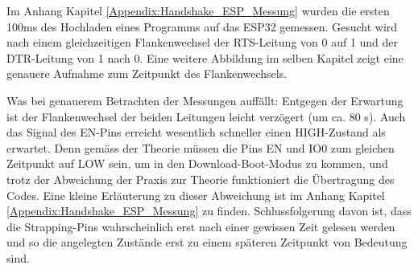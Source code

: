 \begin{enumerate}
\begin{enumerate}
Im Anhang Kapitel \ref{Appendix:Handshake_ESP_Messung} wurden die ersten 100ms des Hochladen eines Programms auf das ESP32 gemessen. Gesucht wird nach einem gleichzeitigen Flankenwechsel der RTS-Leitung von 0 auf 1 und der DTR-Leitung von 1 nach 0. Eine weitere Abbildung im selben Kapitel zeigt eine genauere Aufnahme zum Zeitpunkt des Flankenwechsels.

Was bei genauerem Betrachten der Messungen auffällt: Entgegen der Erwartung ist der Flankenwechsel der beiden Leitungen leicht verzögert (um ca. 80 \textmu s). Auch das Signal des EN-Pins erreicht wesentlich schneller einen HIGH-Zustand als erwartet. Denn gemäss der Theorie müssen die Pins EN und IO0 zum gleichen Zeitpunkt auf LOW sein, um in den Download-Boot-Modus zu kommen, und trotz der Abweichung der Praxis zur Theorie funktioniert die Übertragung des Codes. Eine kleine Erläuterung zu dieser Abweichung ist im Anhang Kapitel \ref{Appendix:Handshake_ESP_Messung} zu finden. Schlussfolgerung davon ist, dass die Strapping-Pins wahrscheinlich erst nach einer gewissen Zeit gelesen werden und so die angelegten Zustände erst zu einem späteren Zeitpunkt von Bedeutung sind.

\end{enumerate}

\end{enumerate}
